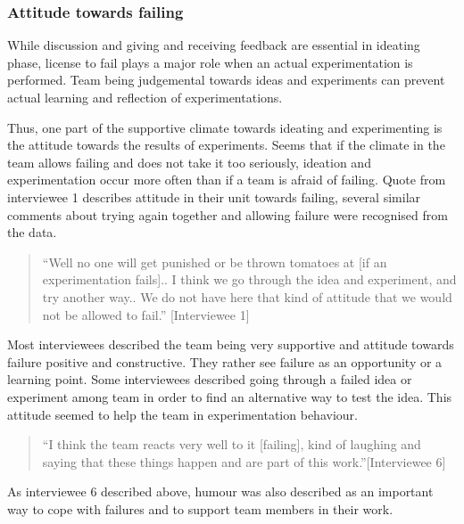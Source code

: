 \subsubsection{Attitude towards failing}
While discussion and giving and receiving feedback are essential in ideating phase, license to fail plays a major role when an actual experimentation is performed. Team being judgemental towards ideas and experiments can prevent actual learning and reflection of experimentations.  

Thus, one part of the supportive climate towards ideating and experimenting is the attitude towards the results of experiments. Seems that if the climate in the team allows failing and does not take it too seriously, ideation and experimentation occur more often than if a team is afraid of failing. Quote from interviewee 1 describes attitude in their unit towards failing, several similar comments about trying again together and allowing failure were recognised from the data. 
\begin{quote}
``Well no one will get punished or be thrown tomatoes at [if an experimentation fails].. I think we go through the idea and experiment, and try another way.. We do not have here that kind of attitude that we would not be allowed to fail.'' [Interviewee 1]
\end{quote}

Most interviewees described the team being very supportive and attitude towards failure positive and constructive. They rather see failure as an opportunity or a learning point. Some interviewees described going through a failed idea or experiment among team in order to find an alternative way to test the idea. This attitude seemed to help the team in experimentation behaviour. 
\begin{quote}
``I think the team reacts very well to it [failing], kind of laughing and saying that these things happen and are part of this work.''[Interviewee 6]
\end{quote}
As interviewee 6 described above, humour was also described as an important way to cope with failures and to support team members in their work. 

